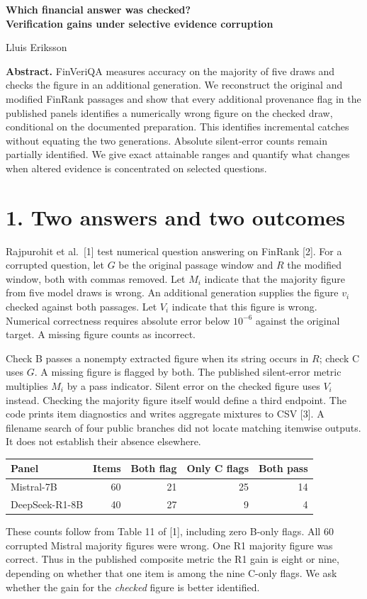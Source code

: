 \documentclass[11pt]{article}
\begin{document}
\begin{center}{\Large\bfseries Which financial answer was checked?\\ Verification gains under selective evidence corruption\par}\vspace{6pt}Lluis Eriksson\end{center}
\textbf{Abstract.} FinVeriQA measures accuracy on the majority of five draws and checks the figure in an additional generation. We reconstruct the original and modified FinRank passages and show that every additional provenance flag in the published panels identifies a numerically wrong figure on the checked draw, conditional on the documented preparation. This identifies incremental catches without equating the two generations. Absolute silent-error counts remain partially identified. We give exact attainable ranges and quantify what changes when altered evidence is concentrated on selected questions.

\section*{1. Two answers and two outcomes}
Rajpurohit et al.\ [1] test numerical question answering on FinRank [2]. For a corrupted question, let $G$ be the original passage window and $R$ the modified window, both with commas removed. Let $M_i$ indicate that the majority figure from five model draws is wrong. An additional generation supplies the figure $v_i$ checked against both passages. Let $V_i$ indicate that this figure is wrong. Numerical correctness requires absolute error below $10^{-6}$ against the original target. A missing figure counts as incorrect.

Check B passes a nonempty extracted figure when its string occurs in $R$; check C uses $G$. A missing figure is flagged by both. The published silent-error metric multiplies $M_i$ by a pass indicator. Silent error on the checked figure uses $V_i$ instead. Checking the majority figure itself would define a third endpoint. The code prints item diagnostics and writes aggregate mixtures to CSV [3]. A filename search of four public branches did not locate matching itemwise outputs. It does not establish their absence elsewhere.

\begin{center}\begin{tabular}{lrrrr}\toprule
Panel & Items & Both flag & Only C flags & Both pass\\\midrule
Mistral-7B &60&21&25&14\\
DeepSeek-R1-8B &40&27&9&4\\\bottomrule
\end{tabular}\end{center}
These counts follow from Table 11 of [1], including zero B-only flags. All 60 corrupted Mistral majority figures were wrong. One R1 majority figure was correct. Thus in the published composite metric the R1 gain is eight or nine, depending on whether that one item is among the nine C-only flags. We ask whether the gain for the \emph{checked} figure is better identified.
\end{document}
